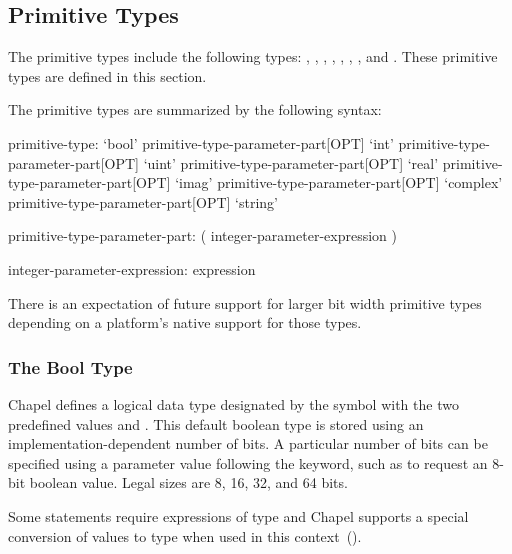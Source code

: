 \subsection{Primitive Types}
\label{Primitive_Types}

The primitive types include the following types: ,
, , , , ,
, and .  These primitive types are defined
in this section.

The primitive types are summarized by the following syntax:
\begin{syntax}
primitive-type:
  `bool' primitive-type-parameter-part[OPT]
  `int' primitive-type-parameter-part[OPT]
  `uint' primitive-type-parameter-part[OPT]
  `real' primitive-type-parameter-part[OPT]
  `imag' primitive-type-parameter-part[OPT]
  `complex' primitive-type-parameter-part[OPT]
  `string'

primitive-type-parameter-part:
  ( integer-parameter-expression )

integer-parameter-expression:
  expression
\end{syntax}


\begin{openissue}
There is an expectation of future support for larger bit width
primitive types depending on a platform's native support for those
types.
\end{openissue}


\subsubsection{The Bool Type}
\label{The_Bool_Type}

Chapel defines a logical data type designated by the symbol
 with the two predefined values  and
.  This default boolean type is stored using an
implementation-dependent number of bits.  A particular number of bits
can be specified using a parameter value following the 
keyword, such as  to request an 8-bit boolean value.
Legal sizes are 8, 16, 32, and 64 bits.


Some statements require expressions of  type and Chapel
supports a special conversion of values to  type when used
in this context~().


